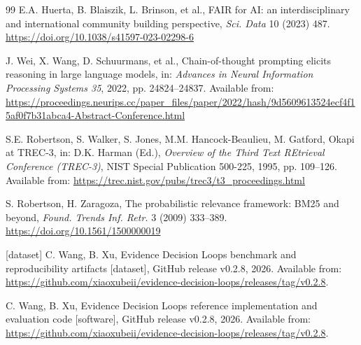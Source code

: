 \documentclass[11pt,a4paper]{article}
\begin{document}
\begin{thebibliography}{99}
E.A. Huerta, B. Blaiszik, L. Brinson, et al., FAIR for AI: an interdisciplinary and international community building perspective, \emph{Sci. Data} 10 (2023) 487. \url{https://doi.org/10.1038/s41597-023-02298-6}

J. Wei, X. Wang, D. Schuurmans, et al., Chain-of-thought prompting elicits reasoning in large language models, in: \emph{Advances in Neural Information Processing Systems 35}, 2022, pp. 24824--24837. Available from: \url{https://proceedings.neurips.cc/paper_files/paper/2022/hash/9d5609613524ecf4f15af0f7b31abca4-Abstract-Conference.html}

S.E. Robertson, S. Walker, S. Jones, M.M. Hancock-Beaulieu, M. Gatford, Okapi at TREC-3, in: D.K. Harman (Ed.), \emph{Overview of the Third Text REtrieval Conference (TREC-3)}, NIST Special Publication 500-225, 1995, pp. 109--126. Available from: \url{https://trec.nist.gov/pubs/trec3/t3_proceedings.html}

S. Robertson, H. Zaragoza, The probabilistic relevance framework: BM25 and beyond, \emph{Found. Trends Inf. Retr.} 3 (2009) 333--389. \url{https://doi.org/10.1561/1500000019}

[dataset] C. Wang, B. Xu, Evidence Decision Loops benchmark and reproducibility artifacts [dataset], GitHub release v0.2.8, 2026. Available from: \url{https://github.com/xiaoxubeii/evidence-decision-loops/releases/tag/v0.2.8}.

C. Wang, B. Xu, Evidence Decision Loops reference implementation and evaluation code [software], GitHub release v0.2.8, 2026. Available from: \url{https://github.com/xiaoxubeii/evidence-decision-loops/releases/tag/v0.2.8}.

\end{thebibliography}
\end{document}
